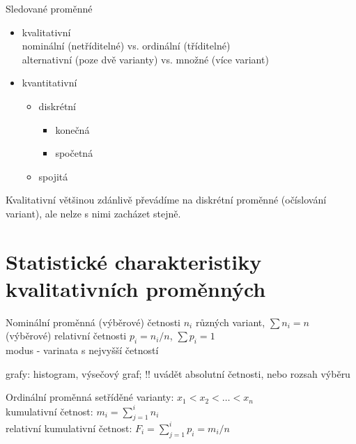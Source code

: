 \documentclass[smaller]{beamer}
\def\xskip{{\vspace{2ex}}}
\begin{document}
\begin{frame}{Sledované proměnné}
\begin{itemize}
\item kvalitativní\\
	nominální (netříditelné) vs. ordinální (tříditelné)\\
	alternativní (poze dvě varianty) vs. množné (více variant)\\
\item kvantitativní \\
      \begin{itemize}
       \item diskrétní 
         \begin{itemize}
         \item konečná
         \item spočetná
         \end{itemize}
       \item spojitá
       \end{itemize}
\end{itemize}

Kvalitativní většinou zdánlivě převádíme na diskrétní proměnné (očíslování variant), ale nelze s nimi zacházet stejně.
\end{frame}

\section{Statistické charakteristiky kvalitativních proměnných}

\begin{frame}{Nominální proměnná}
\pause (výběrové) četnosti $n_i$ různých variant, $\sum n_i = n$ \\
       (výběrové) relativní četnosti $p_i=n_i/n$, $\sum p_i = 1$ \\
\pause  modus - varinata s nejvyšší četností       

\xskip

grafy: histogram, výsečový graf; !! uvádět absolutní četnosti, nebo rozsah výběru
\end{frame}       

\begin{frame}{Ordinální proměnná}
setříděné varianty: $x_1 < x_2 < \dots < x_n$\\
kumulativní četnost: $m_i = \sum_{j=1}^i n_i$\\
relativní kumulativní četnost: $F_i = \sum_{j=1}^i p_i = m_i / n$
\end{frame}
\end{document}
